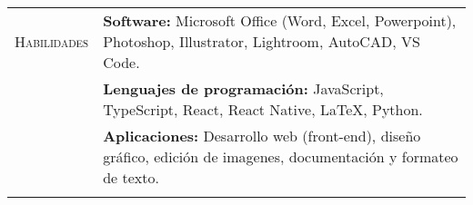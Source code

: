 \documentclass{article}
\begin{document}
\begin{tabular}[t]{@{}p{1.15in} @{}p{5.35in}}
   {\scshape Habilidades}
   &
   \textbf{Software: }  Microsoft Office (Word, Excel, Powerpoint), Photoshop, Illustrator, Lightroom, AutoCAD, VS Code.
   \vspace{0.5\baselineskip}
   \\
   &
   \textbf{Lenguajes de programación:} JavaScript, TypeScript, React, React Native, LaTeX, Python.
   \vspace{0.5\baselineskip}
   \\
   &
   \textbf{Aplicaciones:} Desarrollo web (front-end), diseño gráfico, edición de imagenes, documentación y formateo de texto.
   \\
   \vspace{0.5\baselineskip}
   \\


   \end{tabular}
\end{document}
